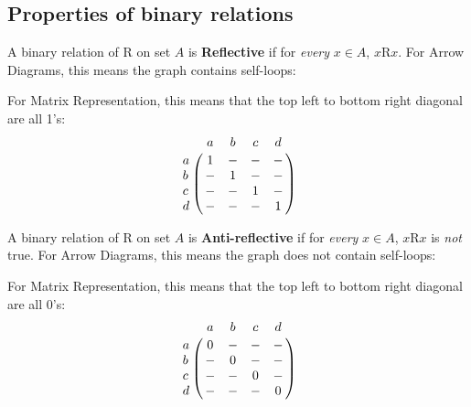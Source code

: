 \subsection{Properties of binary relations}

A binary relation of R on set $A$ is \textbf{Reflective} if for \textit{every} $x \in A$, $x$R$x$.
For Arrow Diagrams, this means the graph contains self-loops:
\begin{center}
\end{center}
For Matrix Representation, this means that the top left to bottom right diagonal are all 1's:
\[
  \bordermatrix{ & a & b & c & d \cr
    a & 1 & - & - & - \cr
    b & - & 1 & - & - \cr
    c & - & - & 1 & - \cr
    d & - & - & - & 1 \cr }
\]

A binary relation of R on set $A$ is \textbf{Anti-reflective} if for \textit{every} $x \in A$, $x$R$x$ is \textit{not} true.
For Arrow Diagrams, this means the graph does not contain self-loops:
\begin{center}
\end{center}
For Matrix Representation, this means that the top left to bottom right diagonal are all 0's:
\[
  \bordermatrix{ & a & b & c & d \cr
    a & 0 & - & - & - \cr
    b & - & 0 & - & - \cr
    c & - & - & 0 & - \cr
    d & - & - & - & 0 \cr }
\]

